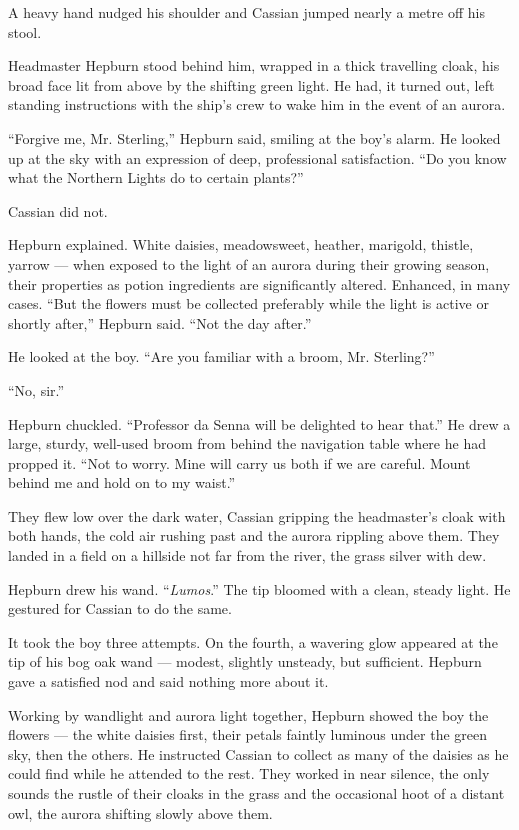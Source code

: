 A heavy hand nudged his shoulder and Cassian jumped nearly a metre off his stool.

Headmaster Hepburn stood behind him, wrapped in a thick travelling cloak, his broad face lit from above by the shifting green light. He had, it turned out, left standing instructions with the ship's crew to wake him in the event of an aurora.

\enquote{Forgive me, Mr. Sterling,} Hepburn said, smiling at the boy's alarm. He looked up at the sky with an expression of deep, professional satisfaction. \enquote{Do you know what the Northern Lights do to certain plants?}

Cassian did not.

Hepburn explained. White daisies, meadowsweet, heather, marigold, thistle, yarrow --- when exposed to the light of an aurora during their growing season, their properties as potion ingredients are significantly altered. Enhanced, in many cases. \enquote{But the flowers must be collected preferably while the light is active or shortly after,} Hepburn said. \enquote{Not the day after.}

He looked at the boy. \enquote{Are you familiar with a broom, Mr. Sterling?}

\enquote{No, sir.}

Hepburn chuckled. \enquote{Professor da Senna will be delighted to hear that.} He drew a large, sturdy, well-used broom from behind the navigation table where he had propped it. \enquote{Not to worry. Mine will carry us both if we are careful. Mount behind me and hold on to my waist.}

They flew low over the dark water, Cassian gripping the headmaster's cloak with both hands, the cold air rushing past and the aurora rippling above them. They landed in a field on a hillside not far from the river, the grass silver with dew.

Hepburn drew his wand. \enquote{\textit{Lumos}.} The tip bloomed with a clean, steady light. He gestured for Cassian to do the same.

It took the boy three attempts. On the fourth, a wavering glow appeared at the tip of his bog oak wand --- modest, slightly unsteady, but sufficient. Hepburn gave a satisfied nod and said nothing more about it.

Working by wandlight and aurora light together, Hepburn showed the boy the flowers --- the white daisies first, their petals faintly luminous under the green sky, then the others. He instructed Cassian to collect as many of the daisies as he could find while he attended to the rest. They worked in near silence, the only sounds the rustle of their cloaks in the grass and the occasional hoot of a distant owl, the aurora shifting slowly above them.

